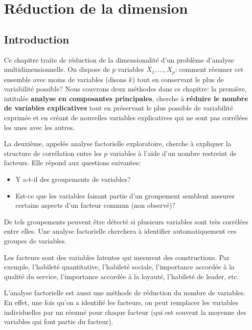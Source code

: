 \documentclass[
  11pt,
  letterpaper,
]{scrbook}
\providecommand{\tightlist}{%
  \setlength{\itemsep}{0pt}\setlength{\parskip}{0pt}}\usepackage{longtable,booktabs,array}
\theoremstyle{definition}
\theoremstyle{remark}
\begin{document}

\hypertarget{analyse-factorielle}{%
\chapter{Réduction de la dimension}\label{analyse-factorielle}}

\hypertarget{introduction-3}{%
\section{Introduction}\label{introduction-3}}

Ce chapitre traite de réduction de la dimensionalité d'un problème
d'analyse multidimensionnelle. On dispose de \(p\) variables
\(X_1, \ldots, X_p\): comment résumer cet ensemble avec moins de
variables (disons \(k\)) tout en conservant le plus de variabilité
possible? Nous couvrons deux méthodes dans ce chapitre: la première,
intitulée \textbf{analyse en composantes principales}, cherche à
\textbf{réduire le nombre de variables explicatives} tout en préservant
le plus possible de variabilité exprimée et en créant de nouvelles
variables explicatives qui ne sont pas corrélées les unes avec les
autres.

La deuxième, appelée analyse factorielle exploratoire, cherche à
expliquer la structure de corrélation entre les \(p\) variables à l'aide
d'un nombre restreint de facteurs. Elle répond aux questions suivantes:

\begin{itemize}
\tightlist
\item
  Y a-t-il des groupements de variables?
\item
  Est-ce que les variables faisant partie d'un groupement semblent
  mesurer certains aspects d'un facteur commun (non observé)?
\end{itemize}

De tels groupements peuvent être détecté si plusieurs variables sont
très corrélées entre elles. Une analyse factorielle cherchera à
identifier automatiquement ces groupes de variables.

Les facteurs sont des variables latentes qui mesurent des constructions.
Par exemple, l'habileté quantitative, l'habileté sociale, l'importance
accordée à la qualité du service, l'importance accordée à la loyauté,
l'habileté de leader, etc.

L'analyse factorielle est aussi une méthode de réduction du nombre de
variables. En effet, une fois qu'on a identifié les facteurs, on peut
remplacer les variables individuelles par un résumé pour chaque facteur
(qui est souvent la moyenne des variables qui font partie du facteur).
\end{document}
